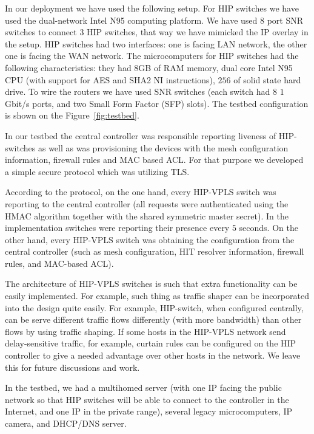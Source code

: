 In our deployment we have used the following setup. For HIP switches we 
have used the dual-network Intel N95 computing platform. We have used $8$ 
port SNR switches to connect $3$ HIP switches, that way we have mimicked the 
IP overlay in the setup. HIP switches had two interfaces: one is facing 
LAN network, the other one is facing the WAN network. The microcomputers for
HIP switches had the following characteristics: they had $8$GB of RAM memory, 
dual core Intel N95 CPU (with support for AES and SHA2 NI instructions), $256$ of 
solid state hard drive. To wire the routers we have used SNR switches 
(each switch had $8$ $1$ Gbit/s ports, and two Small Form Factor (SFP) slots). 
The testbed configuration is shown on the Figure~\ref{fig:testbed}.

In our testbed the central controller was responsible 
reporting liveness of HIP-switches as well as was provisioning 
the devices with the mesh configuration information, firewall rules 
and MAC based ACL. For that purpose we developed a simple 
secure protocol which was utilizing TLS.

According to the protocol, on the one hand, every HIP-VPLS 
switch was reporting to the central controller (all requests were authenticated 
using the HMAC algorithm together with the shared symmetric 
master secret). In the implementation switches were reporting 
their presence every $5$ seconds. On the other hand, every HIP-VPLS switch was obtaining 
the configuration from the central controller (such as mesh 
configuration, HIT resolver information, firewall rules, and 
MAC-based ACL). 

{\eat 
The architecture of HIP-VPLS switches is such
that extra functionality can be easily implemented. For example,
such thing as traffic shaper can be incorporated into the design
quite easily. For example, HIP-switch, when configured centrally, 
can be serve different traffic flows differently (with more bandwidth) than other 
flows by using traffic shaping. If some hosts in the HIP-VPLS network send delay-sensitive traffic, 
for example, curtain rules can be configured on the HIP controller 
to give a needed advantage over other hosts in the network. We 
leave this for future discussions and work.
}

In the testbed, we had a multihomed server (with one IP facing 
the public network so that HIP switches will be able to connect to 
the controller in the Internet, and one IP in the private range), 
several legacy microcomputers, IP camera, and DHCP/DNS server.

